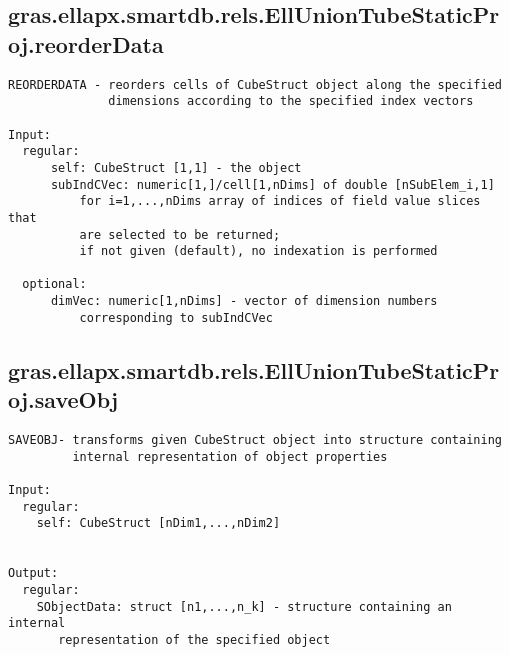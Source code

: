 \subsection{\texorpdfstring{gras.ellapx.smartdb.rels.EllUnionTubeStaticProj.reorderData}{reorderData}}\label{method:gras.ellapx.smartdb.rels.EllUnionTubeStaticProj.reorderData}
\begin{verbatim}
REORDERDATA - reorders cells of CubeStruct object along the specified
              dimensions according to the specified index vectors

Input:
  regular:
      self: CubeStruct [1,1] - the object
      subIndCVec: numeric[1,]/cell[1,nDims] of double [nSubElem_i,1]
          for i=1,...,nDims array of indices of field value slices that
          are selected to be returned;
          if not given (default), no indexation is performed

  optional:
      dimVec: numeric[1,nDims] - vector of dimension numbers
          corresponding to subIndCVec
\end{verbatim}
\subsection{\texorpdfstring{gras.ellapx.smartdb.rels.EllUnionTubeStaticProj.saveObj}{saveObj}}\label{method:gras.ellapx.smartdb.rels.EllUnionTubeStaticProj.saveObj}
\begin{verbatim}
SAVEOBJ- transforms given CubeStruct object into structure containing
         internal representation of object properties

Input:
  regular:
    self: CubeStruct [nDim1,...,nDim2]


Output:
  regular:
    SObjectData: struct [n1,...,n_k] - structure containing an internal
       representation of the specified object
\end{verbatim}
